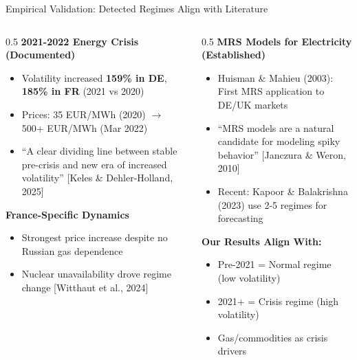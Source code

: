 \documentclass[aspectratio=169]{beamer}
\begin{document}
\begin{frame}{Empirical Validation: Detected Regimes Align with Literature}
\begin{columns}
\begin{column}{0.5\textwidth}
\textbf{2021-2022 Energy Crisis (Documented)}
\begin{itemize}
    \item Volatility increased \textbf{159\% in DE}, \textbf{185\% in FR} (2021 vs 2020)
    \item Prices: 35 EUR/MWh (2020) $\rightarrow$ 500+ EUR/MWh (Mar 2022)
    \item ``A clear dividing line between stable pre-crisis and new era of increased volatility'' {\scriptsize [Keles \& Dehler-Holland, 2025]}
\end{itemize}

\vspace{0.2cm}
\textbf{France-Specific Dynamics}
\begin{itemize}
    \item Strongest price increase despite no Russian gas dependence
    \item Nuclear unavailability drove regime change {\scriptsize [Witthaut et al., 2024]}
\end{itemize}
\end{column}

\begin{column}{0.5\textwidth}
\textbf{MRS Models for Electricity (Established)}
\begin{itemize}
    \item Huisman \& Mahieu (2003): First MRS application to DE/UK markets
    \item ``MRS models are a natural candidate for modeling spiky behavior'' {\scriptsize [Janczura \& Weron, 2010]}
    \item Recent: Kapoor \& Balakrishna (2023) use 2-5 regimes for forecasting
\end{itemize}

\vspace{0.2cm}
\textbf{Our Results Align With:}
\begin{itemize}
    \item \textcolor{reprogreen}{} Pre-2021 = Normal regime (low volatility)
    \item \textcolor{reprogreen}{} 2021+ = Crisis regime (high volatility)
    \item \textcolor{reprogreen}{} Gas/commodities as crisis drivers
\end{itemize}
\end{column}
\end{columns}
\end{frame}
\end{document}
